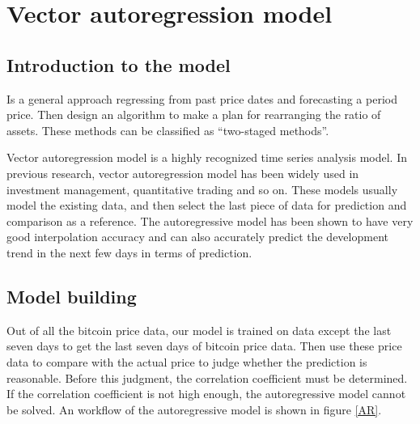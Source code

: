 \documentclass{mcmthesis}
\begin{document}



\section{Vector autoregression model}

\subsection{Introduction to the model}
Is a general approach regressing from past price dates and forecasting a period price. Then design an algorithm to make a plan for rearranging the ratio of assets. These methods can be classified as ``two-staged methods''.

Vector autoregression model is a highly recognized time series analysis model. In previous research, vector autoregression model has been widely used in investment management, quantitative trading and so on. These models usually model the existing data, and then select the last piece of data for prediction and comparison as a reference. The autoregressive model has been shown to have very good interpolation accuracy and can also accurately predict the development trend in the next few days in terms of prediction.


\subsection{Model building}

Out of all the bitcoin price data, our model is trained on data except the last seven days to get the last seven days of bitcoin price data. Then use these price data to compare with the actual price to judge whether the prediction is reasonable. Before this judgment, the correlation coefficient must be determined. If the correlation coefficient is not high enough, the autoregressive model cannot be solved.
An workflow of the autoregressive model is shown in figure \ref{AR}.
\end{document}
